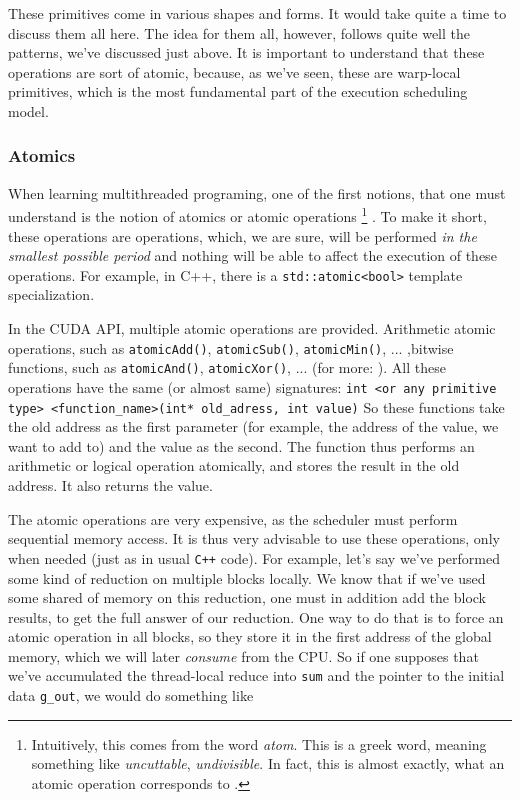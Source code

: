 These primitives come in various shapes and forms. It would take quite a time
to discuss them all here. The idea for them all, however, follows quite well the 
patterns, we've discussed just above. It is important to understand that these operations
are sort of atomic, because, as we've seen, these are warp-local primitives, which is the most 
fundamental part of the execution scheduling model.


\subsubsection*{Atomics}
\label{subsub:atomics}
When learning multithreaded programing, one of the first notions, that one must understand
is the notion of atomics or atomic operations \footnote{Intuitively, 
this comes from the word \textit{atom}. This is a greek word, meaning something 
like \textit{uncuttable}, \textit{undivisible}. In fact, this is almost exactly, what an atomic operation corresponds to 
\cite{atomics} .}
. To make it short, these operations are operations, which, we are sure, will be performed \textit{in the smallest possible
period} and nothing will be able to affect the execution of these operations.
For example, in C++, there is a \verb|std::atomic<bool>| template specialization. 


In the CUDA API, multiple atomic operations are provided. Arithmetic atomic operations, 
such as \verb|atomicAdd()|, \verb|atomicSub()|, \verb|atomicMin()|, ... 
,bitwise functions, such as \verb|atomicAnd()|, \verb|atomicXor()|, ...
(for more: \cite{center}).
All these operations have the same (or almost same) signatures: 
\verb|int <or any primitive type> <function_name>(int* old_adress, int value)|
So these functions take the old address as the first parameter (for example, the address of the value, we want to add to) and 
the value as the second. The function thus performs an arithmetic or logical operation atomically, 
and stores the result in the old address. It also returns the value.


The atomic operations are very expensive, as the scheduler must perform sequential memory access. 
It is thus very advisable to use these operations, only when needed (just as in usual \verb|C++| code).
For example, let's say we've performed some kind of reduction on multiple blocks locally. 
We know that if we've used some shared of memory on this reduction, one must in addition add the block results, to 
get the full answer of our reduction. One way to do that is to force an atomic operation in all blocks, so they store it 
in the first address of the global memory, which we will later \textit{consume} from the CPU. 
So if one  supposes that we've accumulated the thread-local reduce into \verb|sum| and the pointer to the 
initial data \verb|g_out|, we would do something like


